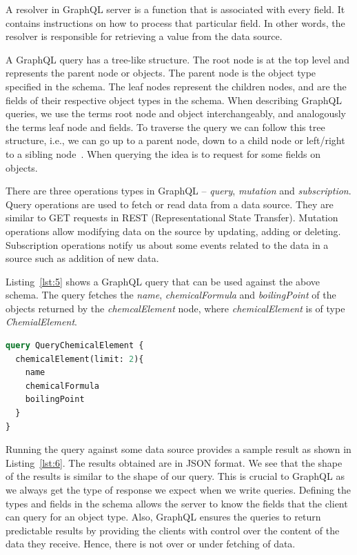 A resolver in GraphQL server is a function that is associated with every field. It contains instructions on how to process that particular field. In other words, the resolver is responsible for retrieving a value from the data source.
 
A GraphQL query has a tree-like structure. The root node is at the top level and represents the parent node or objects. The parent node is the object type specified in the schema. The leaf nodes represent the children nodes, and are the fields of their respective object types in the schema. When describing GraphQL queries, we use the terms root node and object interchangeably, and analogously the terms leaf node and fields. To traverse the query we can follow this tree structure, i.e., we can go up to a parent node, down to a child node or left/right to a sibling node~\cite{Perez2009}. When querying the idea is to request for some fields on objects.

There are three operations types in GraphQL – \textit{query}, \textit{mutation} and \textit{subscription}. Query operations are used to fetch or read data from a data source. They are similar to GET requests in REST (Representational State Transfer). Mutation operations allow modifying data on the source by updating, adding or deleting. Subscription operations notify us about some events related to the data in a source such as addition of new data.

Listing~\ref{lst:5} shows a GraphQL query that can be used against the above schema. The query fetches the \textit{name}, \textit{chemicalFormula} and \textit{boilingPoint} of the objects returned by  the \textit{chemcalElement} node, where \textit{chemicalElement} is of type \textit{ChemialElement}. 

\begin{minipage}{\linewidth}
\begin{lstlisting}[label=lst:5, caption={GraphQL query to fetch chemical elements and their properties}, language=GraphQL]
query QueryChemicalElement {
  chemicalElement(limit: 2){
    name
    chemicalFormula
    boilingPoint
  }
}
\end{lstlisting}
\end{minipage}

Running the query against some data source provides a sample result as shown in Listing~\ref{lst:6}. The results obtained are in JSON format. We see that the shape of the results is similar to the shape of our query. This is crucial to GraphQL as we always get the type of response we expect when we write queries. Defining the types and fields in the schema allows the server to know the fields that the client can query for an object type. Also, GraphQL ensures the queries to return predictable results by providing the clients with control over the content of the data they receive. Hence, there is not over or under fetching of data.



